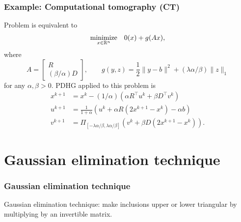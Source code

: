 \documentclass[10pt,mathserif]{beamer}
\begin{document}
\begin{frame}
\frametitle{Example: Computational tomography (CT)}
Problem is equivalent to
\[
\begin{array}{ll}
\underset{x\in \mathbb{R}^n}{\mbox{minimize}}&
0(x)+g(Ax),
\end{array}
\]
where
\[
A=
\begin{bmatrix}
R\\(\beta/\alpha)D
\end{bmatrix},\qquad
g(y,z)=\frac{1}{2}\|y-b\|^2+(\lambda\alpha/\beta) \|z\|_1
\]
for any $\alpha,\beta>0$.
PDHG applied to this problem is
\begin{align*}
x^{k+1}&=x^k
-(1/\alpha)(\alpha R^\intercal u^k+\beta D^\intercal v^k)
\\
u^{k+1}&=
\frac{1}{1+\alpha}(u^k+\alpha R(2x^{k+1}-x^k)-\alpha b)\\
v^{k+1}&=\Pi_{[-\lambda\alpha/\beta,\lambda\alpha/\beta]}\left(v^k+\beta D(2x^{k+1}-x^k)\right).
\end{align*}

\end{frame}



\section{Gaussian elimination technique}
\begin{frame}
\frametitle{Gaussian elimination technique}
Gaussian elimination technique: make inclusions upper or lower triangular by multiplying by an invertible matrix.


\end{frame}
\end{document}
